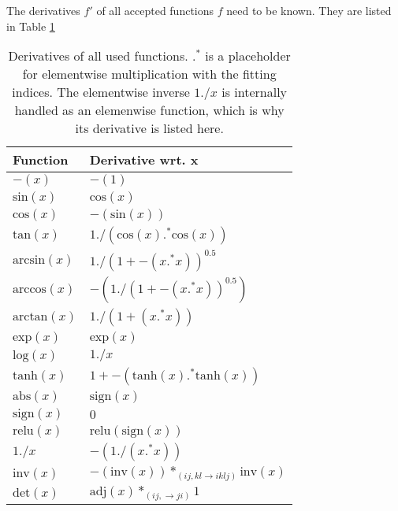 \documentclass[12pt, a4paper]{report}
\begin{document}
The derivatives $f'$ of all accepted functions $f$ need to be known.
They are listed in Table \ref{tab:func_diffs}
\begin{table}[ht]
    \centering
    \begin{tabular}{l | l}
        Function & Derivative wrt. x \\\hline
        $-(x)$ & $-(1)$ \\
        $\text{sin}(x)$ & $\text{cos}(x)$ \\
        $\text{cos}(x)$ & $-(\text{sin}(x))$ \\
        $\text{tan}(x)$ & $1 ./ (\text{cos}(x) .^* \text{cos}(x))$ \\
        $\text{arcsin}(x)$ & $1 ./ (1 + -(x .^* x))^{0.5}$ \\
        $\text{arccos}(x)$ & $-(1 ./ (1 + -(x .^* x))^{0.5})$ \\
        $\text{arctan}(x)$ & $1 ./ (1 + (x .^* x))$ \\
        $\text{exp}(x)$ & $\text{exp}(x)$ \\
        $\text{log}(x)$ & $1 ./ x$ \\
        $\text{tanh}(x)$ & $1 + -(\text{tanh}(x) .^* \text{tanh}(x))$ \\
        $\text{abs}(x)$ & $\text{sign}(x)$ \\
        $\text{sign}(x)$ & $0$ \\
        $\text{relu}(x)$ & $\text{relu}(\text{sign}(x))$ \\
        $1 ./ x$ & $- (1 ./ (x .^* x))$ \\
        $\text{inv}(x)$ & $-(\text{inv}(x)) *_{(ij,kl \rightarrow iklj)} \text{inv}(x)$ \\
        $\text{det}(x)$ & $\text{adj}(x) *_{(ij, \rightarrow ji)} 1$ \\
    \end{tabular}
    \caption{Derivatives of all used functions. $.^*$ is a placeholder for elementwise multiplication with the fitting indices. The elementwise inverse $1 ./ x$ is internally handled as an elemenwise function, which is why its derivative is listed here.} %
    \label{tab:func_diffs}
\end{table}
\FloatBarrier
\end{document}
